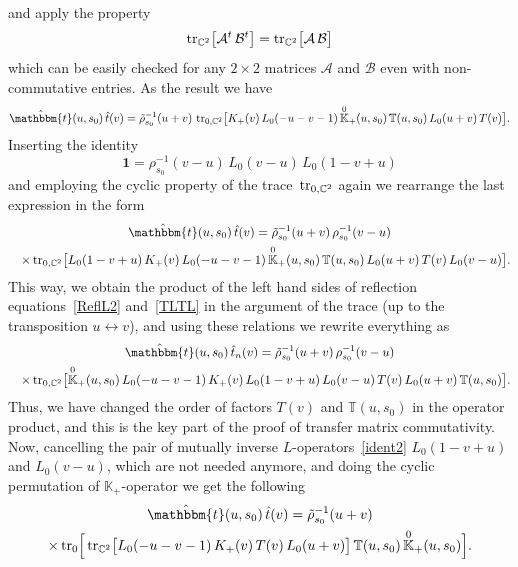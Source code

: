 \documentclass[a4paper,11pt]{article}
\newcommand{\tr}{\mathop{\rm tr}\nolimits}
\numberwithin{equation}{section}
\begin{document}
and apply the property
\begin{equation} \label{trAtBt}
	\tr_{\mathbb{C}^2}\bigl[\mathcal{A}^t\,\mathcal{B}^t\bigr] =
	\tr_{\mathbb{C}^2}\bigl[\mathcal{A}\,\mathcal{B}\bigr]
\end{equation}
which can be easily checked for any $2\times 2$ matrices $\mathcal{A}$ and $\mathcal{B}$ even with non-commutative entries.
As the result we have
\begin{align} \label{bbmtt2}
	\hat{\mathbbm{t}}(u,s_0)\,\hat{t}(v) = \tilde{\rho}_{s_0}^{-1}(u+v)\,
	\tr_{0,\mathbb{C}^2}\bigl[K_+(v)\,L_0(-u-v-1)\,\overset{0}{\mathbb{K}}_+(u,s_0) \, \mathbb{T}(u,s_0)\,L_0(u+v)\,T(v)\bigr].
\end{align}
Inserting the identity
\begin{equation} \label{ident2}
	\bm{1} = \rho_{s_0}^{-1}(v-u) \, L_0(v-u) \, L_0(1-v+u)
\end{equation}
and employing the cyclic property of the trace~$\tr_{0,\mathbb{C}^2}$ again we rearrange the last expression in the form
\begin{multline*}
	\hat{\mathbbm{t}}(u,s_0)\,\hat{t}(v) 
	= \tilde{\rho}_{s_0}^{-1}(u+v)\, \rho_{s_0}^{-1}(v-u) \\
	\quad \times
	\tr_{0,\mathbb{C}^2}\bigl[L_0(1-v+u)\,K_+(v)\,L_0(-u-v-1)\,\overset{0}{\mathbb{K}}_+(u,s_0) \,\mathbb{T}(u,s_0)\,L_0(u+v)\,T(v)\,L_0(v-u)\bigr].
\end{multline*}
This way, we obtain the product of the left hand sides of reflection equations~\eqref{ReflL2} and~\eqref{TLTL} in the argument of the trace (up to the transposition $u\leftrightarrow v$), and using these relations we rewrite everything as
\begin{multline*}
	\hat{\mathbbm{t}}(u,s_0)\,\hat{t}_n(v) 
	= \tilde{\rho}_{s_0}^{-1}(u+v)\, \rho_{s_0}^{-1}(v-u) \\
	\quad \times
	\tr_{0,\mathbb{C}^2}\bigl[\overset{0}{\mathbb{K}}_+(u,s_0)\,L_0(-u-v-1)\,K_+(v)\,L_0(1-v+u) \, L_0(v-u)\,T(v)\,L_0(u+v)\, \mathbb{T}(u,s_0)\bigr].
\end{multline*}
Thus, we have changed the order of factors $T(v)$ and $\mathbb{T}(u,s_0)$ in the operator product, and this is the key part of the proof of transfer matrix commutativity.
Now, cancelling the pair of mutually inverse $L$-operators~\eqref{ident2} $L_0(1-v+u)$ and $L_0(v-u)$, which are not needed anymore, and doing the cyclic permutation of $\mathbb{K}_+$-operator we get the following
\begin{multline} \label{bbmtt}
	\hat{\mathbbm{t}}(u,s_0)\,\hat{t}(v)
	= \tilde{\rho}_{s_0}^{-1}(u+v) \\
	\times
	\tr_{0}\Bigl[ \, 
	\tr_{\mathbb{C}^2}\bigl[L_0(-u-v-1)\,K_+(v)\,T(v)\,L_0(u+v)\bigr] \, \mathbb{T}(u,s_0)\,\overset{0}{\mathbb{K}}_+(u,s_0) \Bigr].
\end{multline}
\end{document}
